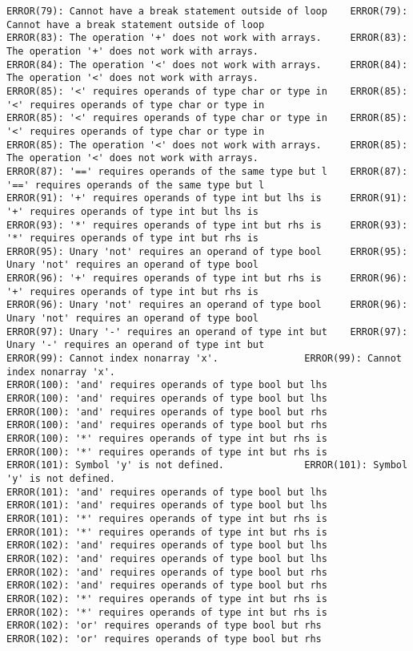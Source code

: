 \documentclass[12pt]{book}
\begin{document}
\begin{lstlisting}
ERROR(79): Cannot have a break statement outside of loop	ERROR(79): Cannot have a break statement outside of loop
ERROR(83): The operation '+' does not work with arrays.		ERROR(83): The operation '+' does not work with arrays.
ERROR(84): The operation '<' does not work with arrays.		ERROR(84): The operation '<' does not work with arrays.
ERROR(85): '<' requires operands of type char or type in	ERROR(85): '<' requires operands of type char or type in
ERROR(85): '<' requires operands of type char or type in	ERROR(85): '<' requires operands of type char or type in
ERROR(85): The operation '<' does not work with arrays.		ERROR(85): The operation '<' does not work with arrays.
ERROR(87): '==' requires operands of the same type but l	ERROR(87): '==' requires operands of the same type but l
ERROR(91): '+' requires operands of type int but lhs is 	ERROR(91): '+' requires operands of type int but lhs is 
ERROR(93): '*' requires operands of type int but rhs is 	ERROR(93): '*' requires operands of type int but rhs is 
ERROR(95): Unary 'not' requires an operand of type bool 	ERROR(95): Unary 'not' requires an operand of type bool 
ERROR(96): '+' requires operands of type int but rhs is 	ERROR(96): '+' requires operands of type int but rhs is 
ERROR(96): Unary 'not' requires an operand of type bool 	ERROR(96): Unary 'not' requires an operand of type bool 
ERROR(97): Unary '-' requires an operand of type int but	ERROR(97): Unary '-' requires an operand of type int but
ERROR(99): Cannot index nonarray 'x'.				ERROR(99): Cannot index nonarray 'x'.
ERROR(100): 'and' requires operands of type bool but lhs	ERROR(100): 'and' requires operands of type bool but lhs
ERROR(100): 'and' requires operands of type bool but rhs	ERROR(100): 'and' requires operands of type bool but rhs
ERROR(100): '*' requires operands of type int but rhs is	ERROR(100): '*' requires operands of type int but rhs is
ERROR(101): Symbol 'y' is not defined.				ERROR(101): Symbol 'y' is not defined.
ERROR(101): 'and' requires operands of type bool but lhs	ERROR(101): 'and' requires operands of type bool but lhs
ERROR(101): '*' requires operands of type int but rhs is	ERROR(101): '*' requires operands of type int but rhs is
ERROR(102): 'and' requires operands of type bool but lhs	ERROR(102): 'and' requires operands of type bool but lhs
ERROR(102): 'and' requires operands of type bool but rhs	ERROR(102): 'and' requires operands of type bool but rhs
ERROR(102): '*' requires operands of type int but rhs is	ERROR(102): '*' requires operands of type int but rhs is
ERROR(102): 'or' requires operands of type bool but rhs 	ERROR(102): 'or' requires operands of type bool but rhs 

\end{lstlisting}
\end{document}
